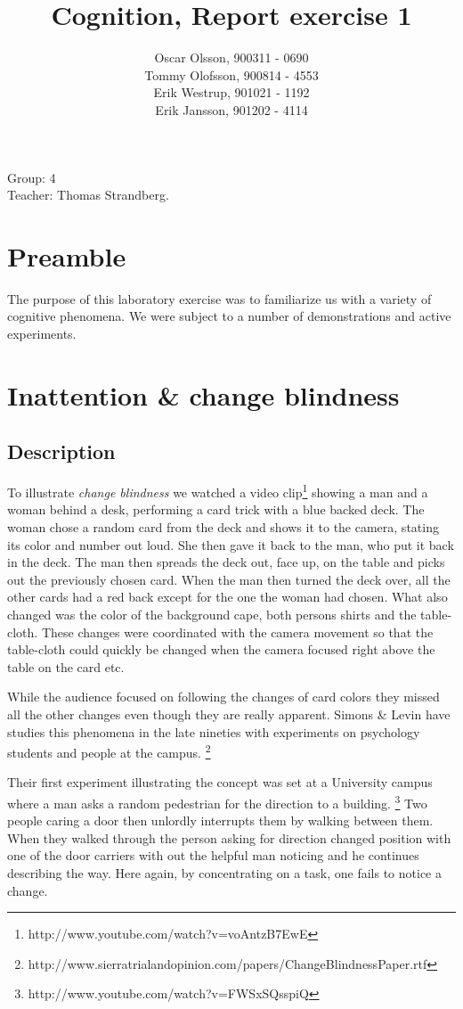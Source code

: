 \documentclass[10pt, a4paper]{article}
\title{Cognition, Report exercise 1}
\date{}
\author{Oscar Olsson, 900311 - 0690\\ Tommy Olofsson, 900814 - 4553\\
	Erik Westrup, 901021 - 1192\\ Erik Jansson, 901202 - 4114}
\begin{document}
\maketitle
\begin{center}
Group: 4 \\
Teacher: Thomas Strandberg.
\end{center}
\newpage

\section{Preamble}
The purpose of this laboratory exercise was to familiarize us with a variety of cognitive phenomena. We were subject to a number of demonstrations and active experiments.

\section{Inattention \& change blindness}
\subsection{Description}
To illustrate \emph{change blindness} we watched a video clip\footnote{http://www.youtube.com/watch?v=voAntzB7EwE} showing a man and a woman behind a desk, performing a card trick with a blue backed deck. The woman chose a random card from the deck and shows it to the camera, stating its color and number out loud. She then gave it back to the man, who put it back in the deck. The man then spreads the deck out, face up, on the table and picks out the previously chosen card. When the man then turned the deck over, all the other cards had a red back except for the one the woman had chosen. What also changed was the color of the background cape, both persons shirts and the table-cloth. These changes were coordinated with the camera movement so that the table-cloth could quickly be changed when the camera focused right above the table on the card etc.

While the audience focused on following the changes of card colors they missed all the other changes even though they are really apparent. Simons \& Levin have studies this phenomena in the late nineties with experiments on psychology students and people at the campus. \footnote{http://www.sierratrialandopinion.com/papers/ChangeBlindnessPaper.rtf}

Their first experiment illustrating the concept was set at a University campus where a man asks a random pedestrian for the direction to a building. \footnote{http://www.youtube.com/watch?v=FWSxSQsspiQ}  Two people caring a door then unlordly interrupts them by walking between them. When they walked through the person asking for direction changed position with one of the door carriers with out the helpful man noticing and he continues describing the way. Here again, by concentrating on a task, one fails to notice a change.
\end{document}
